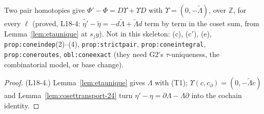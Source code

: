 \begin{theorem}\label{prop:coneindep}
  \leanok
  Two pair homotopies give $\Phi'-\Phi=D\Upsilon+\Upsilon D$ with $\Upsilon=(0,-\widetilde\Lambda)$, over $\mathbb Z$, for every
  $\ell$ (proved, L18-4: $\widetilde{\eta'}-\widetilde\eta=-d\widetilde\Lambda+\widetilde\Lambda d$ term by term in the coset sum,
  from Lemma~\ref{lem:etaunique} at $s_jy$). Not in this skeleton:
  (c), (c$'$), (e), \texttt{prop:coneindep}(2)--(4), \texttt{prop:strictpair}, \texttt{prop:coneintegral},
  \texttt{prop:coneroutes}, \texttt{obl:coneexact} (they need G2's $\tau$-uniqueness, the combinatorial model, or base change).
\end{theorem}
\begin{proof}
  \leanok
  (L18-4.) Lemma~\ref{lem:etaunique} gives $\Lambda$ with (T1); $\Upsilon(c,c_\partial)=(0,-\widetilde\Lambda c)$ and
  Lemma~\ref{lem:cosettransport-24} turn $\eta'-\eta=\partial\Lambda-\Lambda\partial$ into the cochain identity.
\end{proof}
